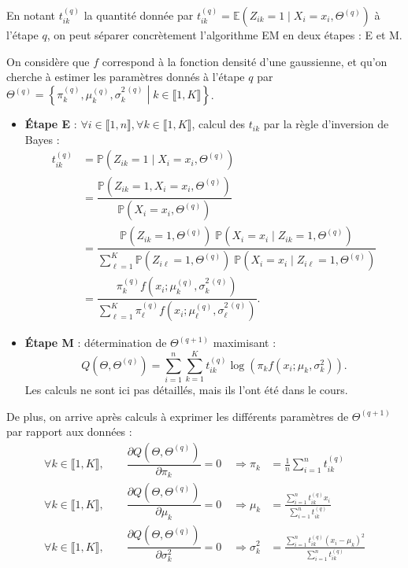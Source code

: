 \documentclass[
]{article}
\begin{document}
En notant \(t_{ik}^{(q)}\) la quantité donnée par
\({\displaystyle t_{ik}^{(q)}=\mathbb{E}\left(Z_{ik} = 1 \mid X_i = x_i,\Theta ^{(q)}\right)}\)
à l'étape \(q\), on peut séparer concrètement l'algorithme EM en deux
étapes : E et M.

On considère que \(f\) correspond à la fonction densité d'une
gaussienne, et qu'on cherche à estimer les paramètres donnés à l'étape
\(q\) par
\(\Theta^{(q)} = \left\{ \pi_k^{(q)}, \mu_k^{(q)}, \sigma_k^{2\,(q)} \middle| k \in \llbracket 1, K \rrbracket \right\}\).

\begin{itemize}
    \item \textbf{Étape E} : $\forall i \in \llbracket 1, n\rrbracket, \forall k \in \llbracket 1, K \rrbracket$, calcul des $t_{ik}$ par la règle d'inversion de Bayes :
        \begin{align*}
            t_{ik}^{(q)} &= \mathbb{P}\left(Z_{ik} = 1 \mid X_i = x_i,\Theta ^{(q)}\right) \\
            &= \dfrac{\mathbb{P}\left(Z_{ik} = 1, X_i = x_i,\Theta ^{(q)}\right)}{\mathbb{P}\left(X_i = x_i, \Theta ^{(q)}\right)} \\
            &= \dfrac{\mathbb{P}(Z_{ik} = 1, \Theta ^{(q)}) \; \mathbb{P}(X_i = x_i \mid Z_{ik} = 1, \Theta ^{(q)})}{\sum_{\ell=1}^K \mathbb{P}(Z_{i\ell} = 1, \Theta ^{(q)}) \; \mathbb{P}(X_i = x_i \mid Z_{i\ell} = 1, \Theta ^{(q)})} \\
            &= \dfrac{\pi_k^{(q)} f(x_i; \mu_k^{(q)}, \sigma_k^{2\,(q)}) }{\sum_{\ell=1}^K\pi_\ell^{(q)} f(x_i; \mu_\ell^{(q)}, \sigma_\ell^{2\,(q)})}.
        \end{align*}
        
    \item \textbf{Étape M} : détermination de $\Theta^{(q+1)}$ maximisant :
        \begin{equation*}        Q\left(\Theta,\Theta^{(q)}\right)=\sum_{i=1}^n\sum_{k=1}^K t_{ik}^{(q)} \log\left(\pi_k f(x_i; \mu_k, \sigma_k^2) \right).
        \end{equation*}
        Les calculs ne sont ici pas détaillés, mais ils l'ont été dans le cours.
\end{itemize}

De plus, on arrive après calculs à exprimer les différents paramètres de
\(\Theta^{(q+1)}\) par rapport aux données : \begin{align*}
    \forall k \in \llbracket 1, K \rrbracket, \qquad \dfrac{\partial Q(\Theta, \Theta^{(q)})}{\partial \pi_k} = 0 \quad \Longrightarrow \pi_k &= \frac{1}{n}\sum_{i=1}^nt_{ik}^{(q)} \\
    \forall k \in \llbracket 1, K \rrbracket, \qquad \dfrac{\partial Q(\Theta, \Theta^{(q)})}{\partial \mu_k} = 0 \quad \Longrightarrow \mu_k &=\frac{\sum_{i=1}^nt_{ik}^{(q)} x_i}{\sum_{i=1}^nt_{ik}^{(q)}} \\
    \forall k \in \llbracket 1, K \rrbracket, \qquad \dfrac{\partial Q(\Theta, \Theta^{(q)})}{\partial \sigma_k^2} = 0 \quad \Longrightarrow \sigma_{k}^2 &={\frac {\sum_{i=1}^{n}t_{ik}^{(q)}(x_{i}-\mu_{k})^2}{\sum_{i=1}^{n}t_{ik}^{(q)}}}
\end{align*}
\end{document}
